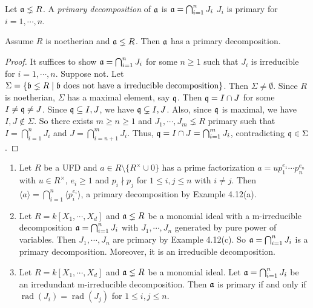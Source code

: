 \begin{definition}
    Let $\mathfrak{a} \lneq R$. A \emph{primary decomposition} of $\mathfrak{a}$ is $\mathfrak{a} = \bigcap_{i=1}^{n} J_i$ $J_i$ is primary for $i = 1,\cdots,n$.
\end{definition}

\begin{theorem}[Noether] 
    Assume $R$ is noetherian and $\mathfrak{a} \lneq R$. Then $\mathfrak{a}$ has a primary decomposition.
\end{theorem}

\begin{proof}
    It suffices to show $\mathfrak{a} = \bigcap_{i=1}^{n} J_i$ for some $n \geq 1$ such that $J_i$ is irreducible for $i = 1,\cdots,n$. Suppose not. Let $\Sigma = \{\mathfrak{b} \lneq R \mid \mathfrak{b} \text{ does not have a irreducible decomposition}\}$. Then $\Sigma \neq \emptyset$. Since $R$ is noetherian, $\Sigma$ has a maximal element, say $\mathfrak{q}$. Then $\mathfrak{q} = I \cap J$ for some $I \neq \mathfrak{q} \neq J$. Since $\mathfrak{q} \subseteq I,J$, we have $\mathfrak{q} \subsetneq I,J$. Also, since $\mathfrak{q}$ is maximal, we have $I,J \not \in \Sigma$. So there exists $m \geq n \geq 1$ and $J_1,\cdots,J_m \lneq R$ primary such that $I = \bigcap_{i=1}^{n}J_i$ and $J = \bigcap_{i=n+1}^{m} J_i$. Thus, $\mathfrak{q} = I \cap J = \bigcap_{i=1}^{m} J_i$, contradicting $\mathfrak{q} \in \Sigma$.
\end{proof}

\begin{example}
    \begin{enumerate}
        \item Let $R$ be a UFD and $a \in R \setminus \{R^{\times} \cup 0\}$ has a prime factorization $a = up_1^{e_1} \cdots p_n^{e_n}$ with $u \in R^{\times}$, $e_i \geq 1$ and $p_i \nmid p_j$ for $1 \leq i,j \leq n$ with $i \neq j$. Then $\langle a \rangle = \bigcap_{i=1}^{n} \langle p_i^{e_i} \rangle$, a primary decomposition by Example 4.12(a). 
        \item Let $R = k[X_1,\cdots,X_d]$ and $\mathfrak{a} \lneq R$ be a monomial ideal with a m-irreducible decomposition $\mathfrak{a} = \bigcap_{i=1}^{n}J_i$ with $J_1,\cdots,J_n$ generated by pure power of variables. Then $J_1,\cdots,J_n$ are primary by Example 4.12(c). So $\mathfrak{a} = \bigcap_{i=1}^{n} J_i$ is a primary decomposition. Moreover, it is an irreducible decomposition.
        \item Let $R = k[X_1,\cdots,X_d]$ and $\mathfrak{a} \lneq R$ be a monomial ideal. Let $\mathfrak{a} = \bigcap_{i=1}^{n} J_i$ be an irredundant m-irreducible decomposition. Then $\mathfrak{a}$ is primary if and only if $\operatorname{rad}(J_i) = \operatorname{rad}(J_j)$ for $1 \leq i,j \leq n$.
    \end{enumerate}
\end{example}

